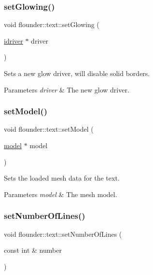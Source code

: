 \subsubsection{\texorpdfstring{set\+Glowing()}{setGlowing()}}
{\footnotesize\ttfamily void flounder\+::text\+::set\+Glowing (\begin{DoxyParamCaption}\item[{\hyperlink{classflounder_1_1idriver}{idriver} $\ast$}]{driver }\end{DoxyParamCaption})}



Sets a new glow driver, will disable solid borders. 


\begin{DoxyParams}{Parameters}
{\em driver} & The new glow driver. \\
\hline
\end{DoxyParams}
\mbox{\label{classflounder_1_1text_afbc27a3e51da717f111d980883afe178}} 
\subsubsection{\texorpdfstring{set\+Model()}{setModel()}}
{\footnotesize\ttfamily void flounder\+::text\+::set\+Model (\begin{DoxyParamCaption}\item[{\hyperlink{classflounder_1_1model}{model} $\ast$}]{model }\end{DoxyParamCaption})\hspace{0.3cm}{\ttfamily [inline]}}



Sets the loaded mesh data for the text. 


\begin{DoxyParams}{Parameters}
{\em model} & The mesh model. \\
\hline
\end{DoxyParams}
\mbox{\label{classflounder_1_1text_a5c4722b49473fb68783d921dd50fa329}} 
\subsubsection{\texorpdfstring{set\+Number\+Of\+Lines()}{setNumberOfLines()}}
{\footnotesize\ttfamily void flounder\+::text\+::set\+Number\+Of\+Lines (\begin{DoxyParamCaption}\item[{const int \&}]{number }\end{DoxyParamCaption})\hspace{0.3cm}{\ttfamily [inline]}}



